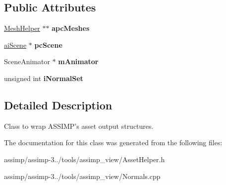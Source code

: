 \subsection*{Public Attributes}
\begin{DoxyCompactItemize}
\item 
\hypertarget{class_asset_helper_a65eaf55da25fee7961aeed945d12a21e}{\hyperlink{class_asset_helper_1_1_mesh_helper}{Mesh\+Helper} $\ast$$\ast$ {\bfseries apc\+Meshes}}\label{class_asset_helper_a65eaf55da25fee7961aeed945d12a21e}

\item 
\hypertarget{class_asset_helper_aeb1f0049732d908dff442f7699f3b75a}{\hyperlink{structai_scene}{ai\+Scene} $\ast$ {\bfseries pc\+Scene}}\label{class_asset_helper_aeb1f0049732d908dff442f7699f3b75a}

\item 
\hypertarget{class_asset_helper_a7f92c1a1151a42bac84799e6806838a0}{Scene\+Animator $\ast$ {\bfseries m\+Animator}}\label{class_asset_helper_a7f92c1a1151a42bac84799e6806838a0}

\item 
\hypertarget{class_asset_helper_af1a7bda4e5883b0bff0be70310fbbb44}{unsigned int {\bfseries i\+Normal\+Set}}\label{class_asset_helper_af1a7bda4e5883b0bff0be70310fbbb44}

\end{DoxyCompactItemize}


\subsection{Detailed Description}
Class to wrap A\+S\+S\+I\+M\+P's asset output structures. 

The documentation for this class was generated from the following files\+:\begin{DoxyCompactItemize}
\item 
assimp/assimp-\/3../tools/assimp\+\_\+view/Asset\+Helper.\+h\item 
assimp/assimp-\/3../tools/assimp\+\_\+view/Normals.\+cpp\end{DoxyCompactItemize}
